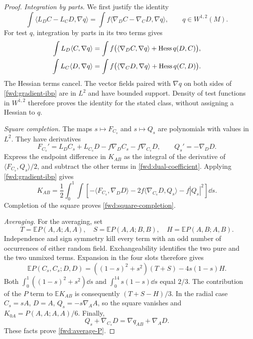 \begin{proof}
\emph{Integration by parts.}
We first justify the identity
\begin{equation}
\label{fwd:gradient-ibp}
 \int\langle L_DC-L_CD,\nabla q\rangle
 =\int f\langle\nabla_DC-\nabla_CD,\nabla q\rangle,
 \qquad q\in W^{1,2}(M).
\end{equation}
For test \(q\), integration by parts in its two terms gives
\begin{align*}
 \int L_D\langle C,\nabla q\rangle
 &=\int f\bigl(\langle\nabla_DC,\nabla q\rangle
                    +\operatorname{Hess} q(D,C)\bigr),\\
 \int L_C\langle D,\nabla q\rangle
 &=\int f\bigl(\langle\nabla_CD,\nabla q\rangle
                    +\operatorname{Hess} q(C,D)\bigr).
\end{align*}
The Hessian terms cancel. The vector fields paired with
\(\nabla q\) on both sides of \eqref{fwd:gradient-ibp} are in
\(L^2\) and have bounded support. Density of test functions in
\(W^{1,2}\) therefore proves the identity for the stated class,
without assigning a Hessian to \(q\).

\emph{Square completion.}
The maps \(s\mapsto F_{C_s}\) and \(s\mapsto Q_s\) are
polynomials with values in \(L^2\). They have derivatives
\[
 F_{C_s}'=L_DC_s+L_{C_s}D-f\nabla_DC_s-f\nabla_{C_s}D,
 \qquad Q_s'=-\nabla_DD.
\]
Express the endpoint difference in \(K_{AB}\) as the integral of
the derivative of \(\langle F_{C_s},Q_s\rangle/2\), and subtract
the other terms in \eqref{fwd:dual-coefficient}. Applying
\eqref{fwd:gradient-ibp} gives
\[
 K_{AB}=\frac12\int_0^1\int
 \left[-\langle F_{C_s},\nabla_DD\rangle
       -2f\langle\nabla_{C_s}D,Q_s\rangle-f|Q_s|^2\right]\dd s.
\]
Completion of the square proves \eqref{fwd:square-completion}.

\emph{Averaging.}
For the averaging, set
\[
 T=\mathbb E P(A,A;A,A),\quad
 S=\mathbb E P(A,A;B,B),\quad
 H=\mathbb E P(A,B;A,B).
\]
Independence and sign symmetry kill every term with an odd number
of occurrences of either random field. Exchangeability identifies
the two pure and the two unmixed terms. Expansion in the four slots
therefore gives
\[
 \mathbb E P(C_s,C_s;D,D)
 =((1-s)^2+s^2)(T+S)-4s(1-s)H.
\]
Both \(\int_0^1((1-s)^2+s^2)\dd s\) and
\(\int_0^14s(1-s)\dd s\) equal \(2/3\). The contribution of the
\(P\) term to \(\mathbb E K_{AB}\) is consequently
\((T+S-H)/3\). In the radial case \(C_s=sA\), \(D=A\),
\(Q_s=-s\nabla_AA\), so the square vanishes and
\(K_{0A}=P(A,A;A,A)/6\). Finally,
\[
 Q_s+\nabla_{C_s}D=\nabla q_{AB}+\nabla_AD.
\]
These facts prove \eqref{fwd:average-P}.


\end{proof}
